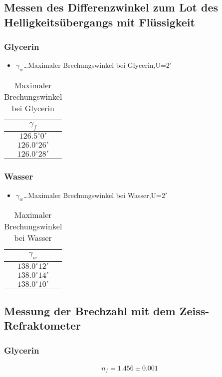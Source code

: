 \documentclass[a4paper]{article}
\begin{document}
\subsection{Messen des Differenzwinkel zum Lot des Helligkeitsübergangs mit Flüssigkeit}
\subsubsection{Glycerin}
\begin{table}[ht]
				\centering
				\caption{Maximaler Brechungswinkel bei Glycerin}
				\begin{itemize}
								\item $\gamma_w$\dots Maximaler Brechungswinkel bei Glycerin,U=$2'$
				\end{itemize}
				\begin{tabular}{|c|}\hline
								$\gamma_f$\\\hline
				$126.5^\circ 0'$\\	\hline
				$126.0^\circ 26'$\\	\hline
				$126.0^\circ 28'$\\	\hline
				\end{tabular}
				\label{tab:glycerin}
\end{table}
\subsubsection{Wasser}
\begin{table}[ht]
				\centering
				\caption{Maximaler Brechungswinkel bei Wasser}
				\begin{itemize}
								\item $\gamma_w$\dots Maximaler Brechungswinkel bei Wasser,U=$2'$
				\end{itemize}
				\begin{tabular}{|c|}\hline
								$\gamma_w$\\\hline
				$138.0^\circ 12'$\\	\hline
				$138.0^\circ 14'$\\	\hline
				$138.0^\circ 10'$\\	\hline
				\end{tabular}
				\label{tab:wasser}
\end{table}

\subsection{Messung der Brechzahl mit dem Zeiss-Refraktometer}
\subsubsection{Glycerin}
\begin{align}
	n_f=1.456\pm 0.001				
\end{align}
\end{document}
